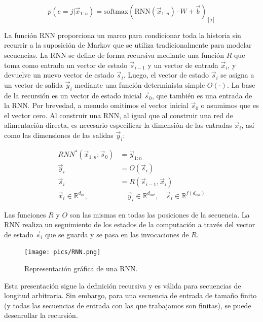 \documentclass{book}
\begin{document}
\begin{displaymath}
p(e = j|\vec{x}_{1:n}) = \text{softmax}(\text{RNN}(\vec{x}_{1:n})\cdot W +\vec{b})_{[j]}
\end{displaymath}

La función RNN proporciona un marco para condicionar toda la historia sin recurrir a la suposición de Markov que se utiliza tradicionalmente para modelar secuencias. La RNN se define de forma recursiva mediante una función $R$ que toma como entrada un vector de estado $\vec{s}_{i-1}$ y un vector de entrada $\vec{x}_{i}$, y devuelve un nuevo vector de estado $\vec{s}_i$. Luego, el vector de estado $\vec{s}_i$ se asigna a un vector de salida $\vec{y}_i$ mediante una función determinista simple $O(\cdot)$. La base de la recursión es un vector de estado inicial $\vec{s}_{0}$, que también es una entrada de la RNN. Por brevedad, a menudo omitimos el vector inicial $\vec{s}_{0}$ o asumimos que es el vector cero. Al construir una RNN, al igual que al construir una red de alimentación directa, es necesario especificar la dimensión de las entradas $\vec{x}_i$, así como las dimensiones de las salidas $\vec{y}_i$:

\begin{equation}
\begin{split}
RNN^{*}(\vec{x}_{1:n};\vec{s}_0) & = \vec{y}_{1:n} \\
\vec{y}_i & = O(\vec{s}_i) \\
\vec{s}_i & = R(\vec{s}_{i-1},\vec{x}_i) \\
\vec{x}_i \in \mathbb{R}^{d_{in}}, & \quad \vec{y}_i \in \mathbb{R}^{d_{out}}, \quad \vec{s}_i \in \mathbb{R}^{f(d_{out})}
\end{split}
\end{equation}

Las funciones $R$ y $O$ son las mismas en todas las posiciones de la secuencia. La RNN realiza un seguimiento de los estados de la computación a través del vector de estado $\vec{s}_i$ que se guarda y se pasa en las invocaciones de $R$.

\begin{figure}[h]
  \centering
  \texttt{[image: pics/RNN.png]}
  \caption{Representación gráfica de una RNN.}
\end{figure}

Esta presentación sigue la definición recursiva y es válida para secuencias de longitud arbitraria. Sin embargo, para una secuencia de entrada de tamaño finito (y todas las secuencias de entrada con las que trabajamos son finitas), se puede desenrollar la recursión.
\end{document}
